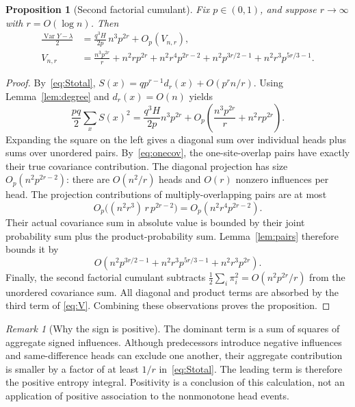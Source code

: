 \documentclass[11pt]{article}
\newtheorem{proposition}[theorem]{Proposition}
\theoremstyle{definition}\newtheorem{definition}[theorem]{Definition}
\theoremstyle{remark}\newtheorem{remark}[theorem]{Remark}
\newcommand{\Var}{\operatorname{Var}}
\newcommand{\la}{\lambda}
\begin{document}
\begin{proposition}[Second factorial cumulant]\label{prop:variance}
Fix $p\in(0,1)$, and suppose $r\to\infty$ with $r=O(\log n)$.
Then
\begin{align}
 \frac{\Var Y-\la}{2}
  &=\frac{q^3H}{2p}\,n^3p^{2r}+O_p(V_{n,r}),\label{eq:variancelead}\\
 V_{n,r}
  &=\frac{n^3p^{2r}}r+n^2rp^{2r}
    +n^2r^4p^{2r-2}
    +n^2p^{3r/2-1}+n^2r^3p^{5r/3-1}.
 \label{eq:V}
\end{align}
\end{proposition}
\begin{proof}
By~\eqref{eq:Stotal}, $S(x)=qp^{r-1}d_r(x)+O(p^rn/r)$.
Using Lemma~\ref{lem:degree} and $d_r(x)=O(n)$ yields
\begin{equation}
 \frac{pq}{2}\sum_x S(x)^2
 =\frac{q^3H}{2p}n^3p^{2r}
       +O_p\left(\frac{n^3p^{2r}}r+n^2rp^{2r}\right).
 \label{eq:projectionnorm}
\end{equation}
Expanding the square on the left gives a diagonal sum over individual
heads plus sums over unordered pairs. By~\eqref{eq:onecov}, the
one-site-overlap pairs have exactly their true covariance contribution.
The diagonal projection has size $O_p(n^2p^{2r-2})$: there are
$O(n^2/r)$ heads and $O(r)$ nonzero influences per head.
The projection contributions of multiply-overlapping pairs are at most
\[
 O_p\bigl((n^2r^3)\,r\,p^{2r-2}\bigr)
       =O_p(n^2r^4p^{2r-2}).
\]
Their actual covariance sum in absolute value is bounded by their joint
probability sum plus the product-probability sum. Lemma~\ref{lem:pairs}
therefore bounds it by
\[
 O\left(n^2p^{3r/2-1}+n^2r^3p^{5r/3-1}
                     +n^2r^3p^{2r}\right).
\]
Finally, the second factorial cumulant subtracts
$\frac12\sum_i\pi_i^2=O(n^2p^{2r}/r)$ from the unordered covariance sum.
All diagonal and product terms are absorbed by the third term of
\eqref{eq:V}. Combining these observations proves the proposition.
\end{proof}

\begin{remark}[Why the sign is positive]
The dominant term is a sum of squares of aggregate signed influences.
Although predecessors introduce negative influences and same-difference
heads can exclude one another, their aggregate contribution is smaller
by a factor of at least $1/r$ in~\eqref{eq:Stotal}. The leading term is
therefore the positive entropy integral. Positivity is a conclusion of
this calculation, not an application of positive association to the
nonmonotone head events.
\end{remark}
\end{document}
